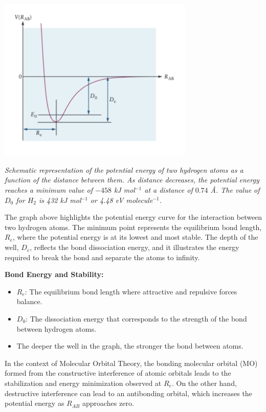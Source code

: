 \documentclass{report}
\begin{document}
\begin{center}
	\includegraphics[width=0.7\textwidth]{1.png}
\end{center}
\textit{Schematic representation of the potential energy of two hydrogen atoms as a function of the distance between them. As distance decreases, the potential energy reaches a minimum value of $-458$ kJ mol$^{-1}$ at a distance of $0.74$ Å. The value of $D_0$ for $H_2$ is 432 kJ mol$^{-1}$ or 4.48 eV molecule$^{-1}$.}

The graph above highlights the potential energy curve for the interaction between two hydrogen atoms. The minimum point represents the equilibrium bond length, $R_e$, where the potential energy is at its lowest and most stable. The depth of the well, $D_e$, reflects the bond dissociation energy, and it illustrates the energy required to break the bond and separate the atoms to infinity.

\textbf{Bond Energy and Stability:}
\begin{itemize}
	\item $R_e$: The equilibrium bond length where attractive and repulsive forces balance.
	\item $D_0$: The dissociation energy that corresponds to the strength of the bond between hydrogen atoms.
	\item The deeper the well in the graph, the stronger the bond between atoms.
\end{itemize}

In the context of Molecular Orbital Theory, the bonding molecular orbital (MO) formed from the constructive interference of atomic orbitals leads to the stabilization and energy minimization observed at $R_e$. On the other hand, destructive interference can lead to an antibonding orbital, which increases the potential energy as $R_{AB}$ approaches zero.
\end{document}
